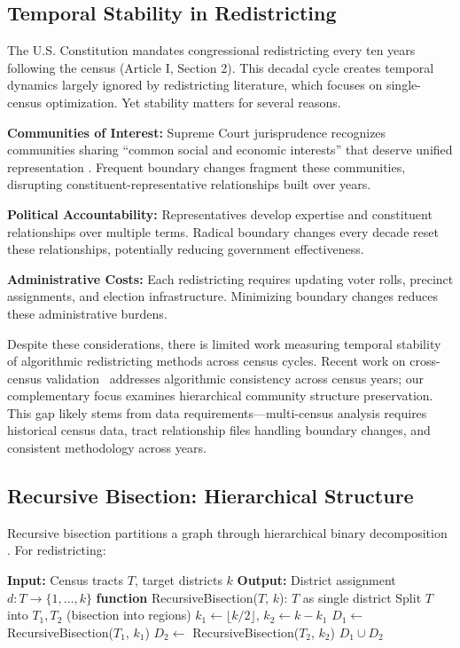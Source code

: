 \subsection{Temporal Stability in Redistricting}

The U.S. Constitution mandates congressional redistricting every ten years following the census (Article I, Section 2). This decadal cycle creates temporal dynamics largely ignored by redistricting literature, which focuses on single-census optimization. Yet stability matters for several reasons.

\textbf{Communities of Interest:} Supreme Court jurisprudence recognizes communities sharing ``common social and economic interests'' that deserve unified representation \citep{communities_of_interest}. Frequent boundary changes fragment these communities, disrupting constituent-representative relationships built over years.

\textbf{Political Accountability:} Representatives develop expertise and constituent relationships over multiple terms. Radical boundary changes every decade reset these relationships, potentially reducing government effectiveness.

\textbf{Administrative Costs:} Each redistricting requires updating voter rolls, precinct assignments, and election infrastructure. Minimizing boundary changes reduces these administrative burdens.

Despite these considerations, there is limited work measuring temporal stability of algorithmic redistricting methods across census cycles. Recent work on cross-census validation~\citep{dellaLibera2026crossCensus} addresses algorithmic consistency across census years; our complementary focus examines hierarchical community structure preservation. This gap likely stems from data requirements—multi-census analysis requires historical census data, tract relationship files handling boundary changes, and consistent methodology across years.

\subsection{Recursive Bisection: Hierarchical Structure}

Recursive bisection partitions a graph through hierarchical binary decomposition \citep{karypis1998fast}. For redistricting:

\begin{algorithmic}
\STATE \textbf{Input:} Census tracts $T$, target districts $k$
\STATE \textbf{Output:} District assignment $d: T \rightarrow \{1,\ldots,k\}$
\STATE
\STATE \textbf{function} RecursiveBisection($T$, $k$):
    \RETURN $T$ as single district
\ELSE
    \STATE Split $T$ into $T_1, T_2$ (bisection into regions)
    \STATE $k_1 \leftarrow \lfloor k/2 \rfloor$, $k_2 \leftarrow k - k_1$
    \STATE $D_1 \leftarrow$ RecursiveBisection($T_1$, $k_1$)
    \STATE $D_2 \leftarrow$ RecursiveBisection($T_2$, $k_2$)
    \RETURN $D_1 \cup D_2$
\ENDIF
\end{algorithmic}

